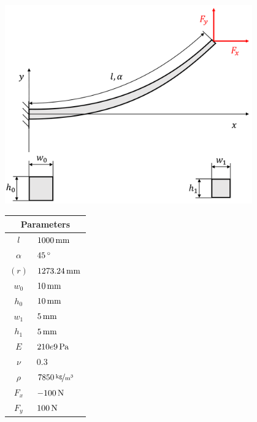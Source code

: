 \begin{minipage}{\textwidth}
	\begin{minipage}[b]{0.7\textwidth}
		\centering
		\includegraphics[width=0.8\textwidth]{figures/verification/reference-beam-4}
	\end{minipage}
	\hfill
	\begin{minipage}[b]{0.29\textwidth}
		\centering
		\begin{tabular}{|cl|}
			\hline
			\multicolumn{2}{|c|}{Parameters} \\
			\hline
			$l$ & $\unit[1000]{mm}$ \\
			$\alpha$ & $\unit[45]{^\circ}$ \\
			$(r)$ & $\unit[1273.24]{mm}$ \\
			$w_0$ & $\unit[10]{mm}$ \\
			$h_0$ & $\unit[10]{mm}$ \\
			$w_1$ & $\unit[5]{mm}$ \\
			$h_1$ & $\unit[5]{mm}$ \\
			$E$ & $\unit[210e9]{Pa}$ \\
			$\nu$ & $0.3$ \\
			$\rho$ & $\unitfrac[7850]{kg}{m^3}$ \\
			$F_x$ & $\unit[-100]{N}$ \\
			$F_y$ & $\unit[100]{N}$ \\
			\hline
		\end{tabular}
	\end{minipage}
\end{minipage}

